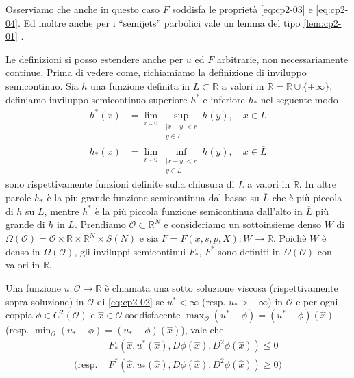 \begin{osservazione}
Osserviamo che anche in questo caso $F$ soddisfa le proprietà \eqref{eq:cp2-03} e \eqref{eq:cp2-04}. Ed inoltre anche per i ``semijets'' parbolici vale un lemma del tipo \ref{lem:cp2-01} \cite[vedi][§3]{giga:main}.
\end{osservazione}

Le definizioni si posso estendere anche per $u$ ed $F$ arbitrarie, non necessariamente continue. Prima di vedere come, richiamiamo la definizione di inviluppo semicontinuo. Sia $h$ una funzione definita in $L\subset\mathbb{R}$ a valori in $\tilde{\mathbb{R}}=\mathbb{R}\cup\{\pm\infty\}$, definiamo inviluppo semicontinuo superiore $h^*$ e inferiore $h_*$ nel seguente modo
\[
\begin{aligned}
  h^*(x) &= \lim_{r\downarrow 0}\sup_{\substack{|x-y|<r \\ y\in L}}h(y),\quad x\in\overline{L} \\
  h_*(x) &= \lim_{r\downarrow 0}\inf_{\substack{|x-y|<r \\ y\in L}}h(y),\quad x\in\overline{L}
\end{aligned}
\]
sono rispettivamente funzioni definite sulla chiusura di $L$ a valori in $\tilde{\mathbb{R}}$. In altre parole $h_*$ è la piu grande funzione semicontinua dal basso su $\overline{L}$ che è più piccola di $h$ su $L$, mentre $h^*$ è la più piccola funzione semicontinua dall'alto in $\overline{L}$ più grande di $h$ in $L$.
Prendiamo $\mathcal{O}\subset\mathbb{R}^N$ e consideriamo un sottoinsieme denso $W$ di $\Omega(\mathcal{O})=\mathcal{O}\times\mathbb{R}\times\mathbb{R}^N\times S(N)$ e sia $F=F(x,s,p,X):W\to\mathbb{R}$. Poichè $W$ è denso in $\Omega(\mathcal{O})$, gli inviluppi semicontinui $F_*$, $F^*$ sono definiti in $\Omega(\mathcal{O})$ con valori in $\tilde{\mathbb{R}}$.
\begin{definizione}
Una funzione $u:\mathcal{O}\to\mathbb{R}$ è chiamata una sotto soluzione viscosa (rispettivamente sopra soluzione) in $\mathcal{O}$ di \eqref{eq:cp2-02} se $u^*<\infty$ (resp. $u_*>-\infty$) in $\mathcal{O}$ e per ogni coppia $\phi\in C^2(\mathcal{O})$ e $\hat{x}\in\mathcal{O}$ soddisfacente $\max_{\mathcal{O}}(u^*-\phi)=(u^*-\phi)(\hat{x})$ (resp. $\min_{\mathcal{O}}(u_*-\phi)=(u_*-\phi)(\hat{x})$), vale che
\[
\begin{aligned}
&F_*(\hat{x},u^*(\hat{x}),D\phi(\hat{x}),D^2\phi(\hat{x}))\leq 0 \\
(\text{resp. }&F^*(\hat{x},u_*(\hat{x}),D\phi(\hat{x}),D^2\phi(\hat{x}))\geq 0)
\end{aligned}
\]
\end{definizione}
